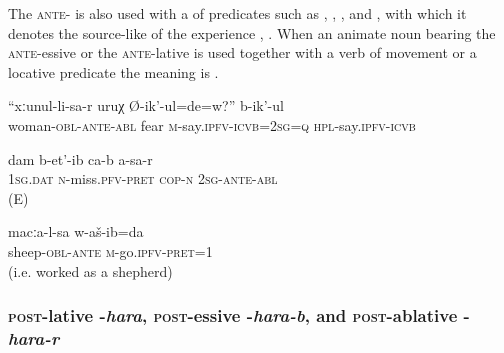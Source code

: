The \textsc{ante}- is also used with a  of  predicates such as , , , and , with which it denotes the source-like  of the experience , . When an animate noun bearing the \textsc{ante}-essive or the \textsc{ante}-lative is used together with a verb of movement or a locative predicate the meaning is  .
%
\begin{exe}
	\ex	\label{They say, are you afraid of your wife}
	\gll	``xːunul-li-sa-r	uruχ	Ø-ik'-ul=de=w?''	b-ik'-ul \\
		woman-\textsc{obl}-\textsc{ante}-\textsc{abl} fear \textsc{m}-say.\textsc{ipfv}-\textsc{icvb}=2\textsc{sg}=\textsc{q} \textsc{hpl}-say.\textsc{ipfv}-\textsc{icvb}\\
	\glt	{}

	\ex	\label{ex:I miss youMorph}
	\gll	dam b-et'-ib ca-b a-sa-r \\
	\textsc{1sg.dat} \textsc{n}-miss.\textsc{pfv-pret} \textsc{cop-n} \textsc{2sg-ante-abl}	\\
	\glt	{} (E)
	
	\ex	\label{I went after the sheep}
	\gll	macːa-l-sa	w-aš-ib=da\\
		sheep-\textsc{obl}-\textsc{ante}	\textsc{m}-go.\textsc{ipfv}-\textsc{pret}=1\\
	\glt‎‎	 (i.e. worked as a shepherd)
\end{exe}



\subsubsection{\textsc{post}-lative -\textit{hara}, \textsc{post}-essive -\textit{hara-b}, and \textsc{post}-ablative -\textit{hara-r}}
\label{sssec:post-lative -hara, postessive -hara-b, and post-\isi{ablative} -hara-r}

